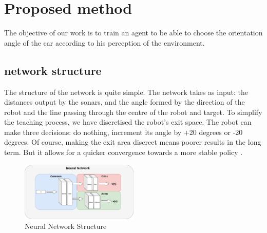 \section*{Proposed method}
The objective of our work is to train an agent to be able to choose the orientation angle of the car according to his perception of the environment. 

\subsection{network structure}

The structure of the network is quite simple. The network takes as input: 
the distances output by the sonars, and the angle formed by the direction of the robot and the line passing through the centre of the robot and target.
To simplify the teaching process, we have discretised the robot's exit space. The robot can make three decisions: do nothing, increment its angle by +20 degrees or -20 degrees.
Of course, making the exit area discreet means poorer results in the long term. But it allows for a quicker convergence towards a more stable policy \cite{Actor}.
    \begin{figure}[H]
        \centering
        \includegraphics[width=0.5\textwidth]{imgs/network.png}
        \caption{\label{fig:method} Neural Network Structure}
    \end{figure}

